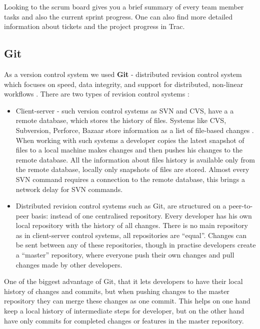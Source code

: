   Looking to the scrum board gives you a brief summary of every team member tasks and 
  also the current sprint progress. One can also find more detailed information
  about tickets and the project progress in Trac.
 
 \subsection{Git}
  As a version control system we used \textbf{Git} - distributed revision control system
  which focuses on speed, data integrity, and support for distributed,
  non-linear workflows \cite{gitDocs}. There are two types of revision control
  systems :
  
   \begin{itemize}
   \item Client-server - such version control systems as SVN and CVS, have a 
    a remote database, which stores the history of files. Systems like CVS,
    Subversion, Perforce, Bazaar store information as  a list of file-based
    changes \cite{gitBasics}. When working with such systems a developer copies
    the latest snapshot of files to a local machine makes changes and then
    pushes his changes to the remote database. All the information about
    files history is available only from the remote database, locally only
    snapshots of files are stored. Almost every SVN command requires a
    connection to the remote database, this brings a network delay for
    SVN commands.
    
   \item Distributed revision control systems such as Git, are structured on a
    peer-to-peer basis: instead of one centralised repository. Every developer
    has his own local repository with the history of all changes. There is no
     main repository as in client-server control systems, all repositories are
     ``equal''. Changes can be sent between any of these repositories, though
     in practise developers create a ``master'' repository,
      where everyone push their own changes and pull
    changes made by other developers.
  \end{itemize}
  
  One of the biggest advantage of Git, that it lets developers to
  have their local history of changes and commits, 
  but when pushing changes to the master repository they can merge these
  changes as one commit.
  This helps on one hand keep a local history of intermediate steps for
  developer, but on the other hand have only commits for completed changes
  or features in the master repository. 
  
